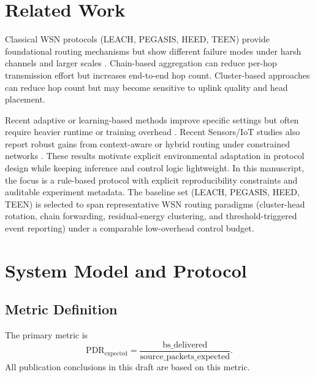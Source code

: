 ﻿\documentclass[sensors,article,submit,moreauthors,pdftex]{Definitions/mdpi}
\begin{document}
\section{Related Work}
Classical WSN protocols (LEACH, PEGASIS, HEED, TEEN) provide foundational routing mechanisms but show different failure modes under harsh channels and larger scales \cite{Heinzelman2002LEACH,Lindsey2002PEGASIS,Younis2004HEED,Kandris2020}. Chain-based aggregation can reduce per-hop transmission effort but increases end-to-end hop count. Cluster-based approaches can reduce hop count but may become sensitive to uplink quality and head placement.

Recent adaptive or learning-based methods improve specific settings but often require heavier runtime or training overhead \cite{Ren2024,Okine2024,Chen2019Survey}. Recent Sensors/IoT studies also report robust gains from context-aware or hybrid routing under constrained networks \cite{ElFouly2023ILP,Dan2024EMRAR,Bhukya2025Hybrid}. These results motivate explicit environmental adaptation in protocol design while keeping inference and control logic lightweight. In this manuscript, the focus is a rule-based protocol with explicit reproducibility constraints and auditable experiment metadata.
The baseline set (LEACH, PEGASIS, HEED, TEEN) is selected to span representative WSN routing paradigms (cluster-head rotation, chain forwarding, residual-energy clustering, and threshold-triggered event reporting) under a comparable low-overhead control budget.

\section{System Model and Protocol}
\subsection{Metric Definition}
The primary metric is
\begin{equation}
\mathrm{PDR}_{\mathrm{expected}} = \frac{\mathrm{bs\_delivered}}{\mathrm{source\_packets\_expected}}.
\end{equation}
All publication conclusions in this draft are based on this metric.
\end{document}
